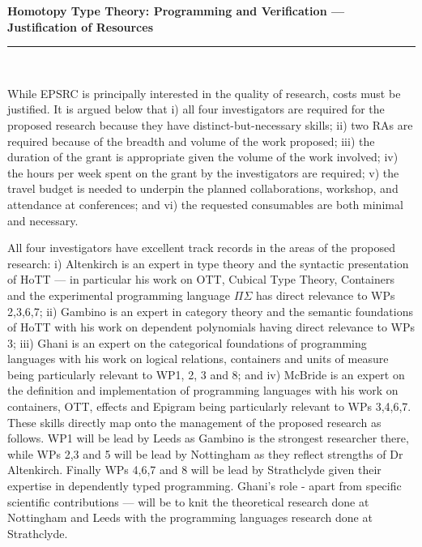 \documentclass[a4paper,11pt]{article}
\begin{document}
\thispagestyle{plain}
\begin{center}
  {\Large \bf Homotopy Type Theory: Programming and Verification ---
  Justification of Resources}\\[1ex]

\vspace*{-0.1in}

\rule{160mm}{.5mm}\\[2ex]
\end{center}

\noindent While EPSRC is principally interested in the quality of research,
costs must be justified. It is argued below that i) all four investigators
are required for the proposed research because they have
distinct-but-necessary skills; ii) two RAs are required because of the
breadth and volume of the work proposed; iii) the duration of the
grant is appropriate given the volume of the work involved; iv) the
hours per week spent on the grant by the investigators are required;
v) the travel budget is needed to underpin the planned collaborations,
workshop, and attendance at conferences; and vi) the requested
consumables are both minimal and necessary.

\vspace{0.02in}

 All four investigators have
excellent track records in the areas of the proposed research: i)
Altenkirch is an expert in type theory and the syntactic presentation
of HoTT --- in particular his work on OTT, Cubical Type Theory,
Containers and the experimental programming language $\Pi\Sigma$ has
direct relevance to WPs 2,3,6,7; ii) Gambino is an expert in category
theory and the semantic foundations of HoTT with his work on dependent
polynomials having direct relevance to WPs 3; iii) Ghani
is an expert on the categorical foundations of programming languages
with his work on logical relations, containers and units of measure
being particularly relevant to WP1, 2, 3 and 8; and iv) McBride is an
expert on the definition and implementation of programming languages
with his work on containers, OTT, effects and Epigram being
particularly relevant to WPs 3,4,6,7. These skills directly
map onto the management of the proposed research as follows. WP1 will
be lead by Leeds as Gambino is the strongest researcher there, while
WPs 2,3 and 5 will be lead by Nottingham as they reflect strengths of
Dr Altenkirch. Finally WPs 4,6,7 and 8 will be lead by Strathclyde
given their expertise in dependently typed programming. Ghani's role -
apart from specific scientific contributions --- will be to knit the
theoretical research done at Nottingham and Leeds with the programming
languages research done at Strathclyde. 
\end{document}

